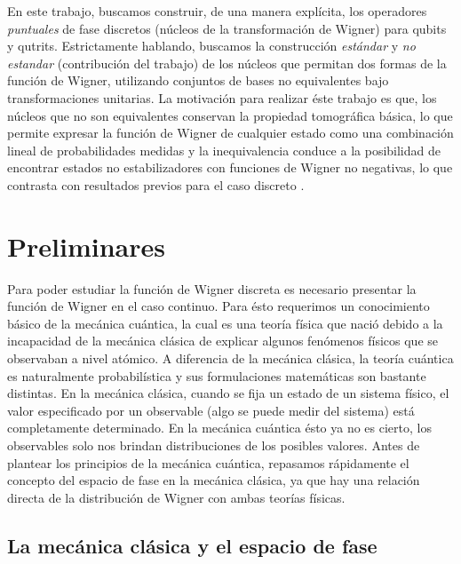 \documentclass[a4paper]{report}
\begin{document}
  En este trabajo, buscamos construir, de una manera
  explícita, los operadores \textit{puntuales} de fase
  discretos (núcleos de la transformación de Wigner) para
  qubits y qutrits. Estrictamente hablando, buscamos la
  construcción \textit{estándar}
  \cite{woottersWignerFunctionFormulationFiniteState1987} y
  \textit{no estandar} (contribución del trabajo) de los
  núcleos que permitan dos formas de la función de Wigner,
  utilizando conjuntos de bases no equivalentes bajo
  transformaciones unitarias. La motivación para realizar
  éste trabajo es que, los núcleos que no son equivalentes
  conservan la propiedad tomográfica básica, lo que permite
  expresar la función de Wigner de cualquier estado como una
  combinación lineal de probabilidades medidas y la
  inequivalencia conduce a la posibilidad de encontrar
  estados no estabilizadores con funciones de Wigner no
  negativas, lo que contrasta con resultados previos para el
  caso discreto
  \cite{grossHudsonTheoremFinitedimensional2006,
  galvaoDiscreteWignerFunctions2005,
  cormickInterferenceDiscreteWigner2006}.

  \chapter{Preliminares}

  Para poder estudiar la función de Wigner discreta es
  necesario presentar la función de Wigner en el caso
  continuo. Para ésto requerimos un conocimiento básico de
  la mecánica cuántica, la cual es una teoría física que
  nació debido a la incapacidad de la mecánica clásica de
  explicar algunos fenómenos físicos que se observaban a
  nivel atómico. A diferencia de la mecánica clásica, la
  teoría cuántica es naturalmente probabilística y sus
  formulaciones matemáticas son bastante distintas. En la
  mecánica clásica, cuando se fija un estado de un sistema
  físico, el valor especificado por un observable (algo se
  puede medir del sistema) está completamente determinado.
  En la mecánica cuántica ésto ya no es cierto, los
  observables solo nos brindan distribuciones de los
  posibles valores. Antes de plantear los principios de la
  mecánica cuántica, repasamos rápidamente el concepto del
  espacio de fase en la mecánica clásica, ya que hay una
  relación directa de la distribución de Wigner con ambas
  teorías físicas.

  \section{La mecánica clásica y el espacio de fase}
\end{document}
